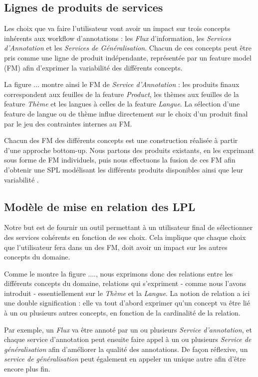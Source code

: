 \documentclass[]{easychair}
\newcommand{\comment}[4]{\par\noindent\hspace*{-0.5cm}{\parbox{\columnwidth}{\textbf{\color{#1}//#2[#3]:#4}}}\par}
\newcommand{\si}[1]{\comment{red}{}{#1}{SI}}
\begin{document}
\subsection{Lignes de produits de services}

Les choix que va faire l'utilisateur vont avoir un impact sur trois concepts inhérents aux workflow d'annotations : les \textit{Flux} d'information, les \textit{Services d'Annotation} et les \textit{Services de Généralisation}. Chacun de ces concepts peut être pris comme une ligne de produit indépendante, représentée par un feature model (FM) afin d'exprimer la variabilité des différents concepts.

La figure ... montre ainsi le FM de \textit{Service d'Annotation} : les produits finaux correspondent aux feuilles de la feature \textit{Product}, les thèmes aux feuilles de la feature \textit{Thème} et les langues à celles de la feature \textit{Langue}. La sélection d'une feature de langue ou de thème influe directement sur le choix d'un produit final par le jeu des contraintes internes au FM. 

\si{à voir si on garde en dessous...}
Chacun des FM des différents concepts est une construction réalisée à partir d'une approche bottom-up. Nous partons des produits existants, en les exprimant sous forme de FM individuels, puis nous effectuons la fusion de ces FM afin d'obtenir une SPL modélisant les différents produits disponibles ainsi que leur variabilité \cite{Acher2011}.

\subsection{Modèle de mise en relation des LPL}

Notre but est de fournir un outil permettant à un utilisateur final de sélectionner des services cohérents en fonction de ses choix. Cela implique que chaque choix que l'utilisateur fera dans un des FM, doit avoir un impact sur les autres concepts du domaine. 

Comme le montre la figure ...., nous exprimons donc des relations entre les différents concepts du domaine, relations qui s'expriment - comme nous l'avons introduit - essentiellement sur le \textit{Thème} et la \textit{Langue}. La notion de relation a ici une double signification : elle va tout d'abord exprimer qu'un concept va être lié à un ou plusieurs autres concepts, en fonction de la cardinalité de la relation.

Par exemple, un \textit{Flux} va être annoté par un ou plusieurs \textit{Service d'annotation}, et chaque service d'annotation peut ensuite faire appel à un ou plusieurs \textit{Service de généralisation} afin d'améliorer la qualité des annotations. De façon réflexive, un \textit{service de généralisation} peut également en appeler un unique autre afin d'être encore plus fin.
\end{document}
